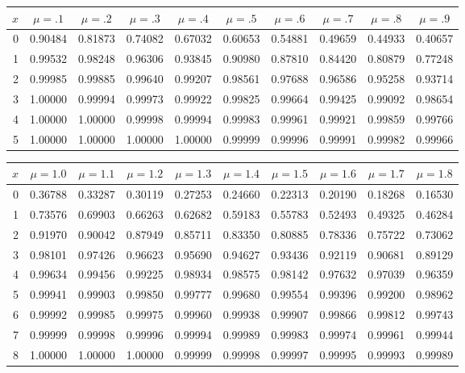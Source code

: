 \def\HEADER{$x$
    &  $\mu=.1$  &  $\mu=.2$  &  $\mu=.3$  &  $\mu=.4$  &  $\mu=.5$
    &  $\mu=.6$  &  $\mu=.7$  &  $\mu=.8$  &  $\mu=.9$ \\\hline}

\medskip\begin{tabular}{r|*{9}{c}}
$x$ &  $\mu=.1$  &  $\mu=.2$  &  $\mu=.3$  &  $\mu=.4$  &  $\mu=.5$
    &  $\mu=.6$  &  $\mu=.7$  &  $\mu=.8$  &  $\mu=.9$                       \\\hline
  0 & 0.90484 & 0.81873 & 0.74082 & 0.67032 & 0.60653 & 0.54881 & 0.49659 & 0.44933 & 0.40657 \\
  1 & 0.99532 & 0.98248 & 0.96306 & 0.93845 & 0.90980 & 0.87810 & 0.84420 & 0.80879 & 0.77248 \\
  2 & 0.99985 & 0.99885 & 0.99640 & 0.99207 & 0.98561 & 0.97688 & 0.96586 & 0.95258 & 0.93714 \\
  3 & 1.00000 & 0.99994 & 0.99973 & 0.99922 & 0.99825 & 0.99664 & 0.99425 & 0.99092 & 0.98654 \\
  4 & 1.00000 & 1.00000 & 0.99998 & 0.99994 & 0.99983 & 0.99961 & 0.99921 & 0.99859 & 0.99766 \\
  5 & 1.00000 & 1.00000 & 1.00000 & 1.00000 & 0.99999 & 0.99996 & 0.99991 & 0.99982 & 0.99966 \\
\end{tabular}

\myskip
\begin{tabular}{r|*{9}{c}}
$x$ &  $\mu=1.0$  &  $\mu=1.1$  &  $\mu=1.2$  &  $\mu=1.3$  &  $\mu=1.4$
    &  $\mu=1.5$  &  $\mu=1.6$  &  $\mu=1.7$  &  $\mu=1.8$                    \\\hline
  0 & 0.36788 & 0.33287 & 0.30119 & 0.27253 & 0.24660 & 0.22313 & 0.20190 & 0.18268 & 0.16530 \\
  1 & 0.73576 & 0.69903 & 0.66263 & 0.62682 & 0.59183 & 0.55783 & 0.52493 & 0.49325 & 0.46284 \\
  2 & 0.91970 & 0.90042 & 0.87949 & 0.85711 & 0.83350 & 0.80885 & 0.78336 & 0.75722 & 0.73062 \\
  3 & 0.98101 & 0.97426 & 0.96623 & 0.95690 & 0.94627 & 0.93436 & 0.92119 & 0.90681 & 0.89129 \\
  4 & 0.99634 & 0.99456 & 0.99225 & 0.98934 & 0.98575 & 0.98142 & 0.97632 & 0.97039 & 0.96359 \\
  5 & 0.99941 & 0.99903 & 0.99850 & 0.99777 & 0.99680 & 0.99554 & 0.99396 & 0.99200 & 0.98962 \\
  6 & 0.99992 & 0.99985 & 0.99975 & 0.99960 & 0.99938 & 0.99907 & 0.99866 & 0.99812 & 0.99743 \\
  7 & 0.99999 & 0.99998 & 0.99996 & 0.99994 & 0.99989 & 0.99983 & 0.99974 & 0.99961 & 0.99944 \\
  8 & 1.00000 & 1.00000 & 1.00000 & 0.99999 & 0.99998 & 0.99997 & 0.99995 & 0.99993 & 0.99989 \\
\end{tabular}

